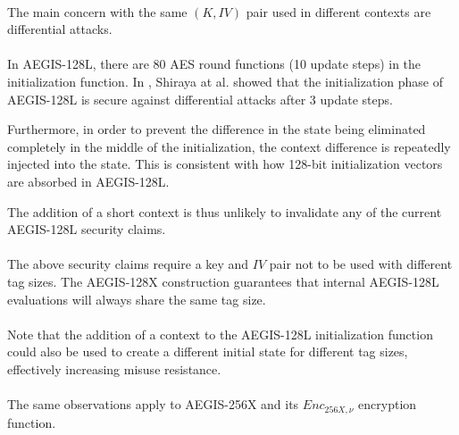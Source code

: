 \documentclass[envcountsame,runningheads,notitlepage]{llncs}
\begin{document}
\paragraph{}

The main concern with the same $(K, IV)$ pair used in different contexts are differential attacks.

\paragraph{}

In AEGIS-128L, there are 80 AES round functions (10 update steps) in the initialization function. In \cite{STSI23}, Shiraya at al. showed that the initialization phase of AEGIS-128L is secure against differential attacks after 3 update steps.

Furthermore, in order to prevent the difference in the state being eliminated completely in the middle of the initialization, the context difference is repeatedly injected into the state. This is consistent with how 128-bit initialization vectors are absorbed in AEGIS-128L.

The addition of a short context is thus unlikely to invalidate any of the current AEGIS-128L security claims.

\paragraph{}

The above security claims require a key and $IV$ pair not to be used with different tag sizes. The AEGIS-128X construction guarantees that internal AEGIS-128L evaluations will always share the same tag size.

\paragraph{}

Note that the addition of a context to the AEGIS-128L initialization function could also be used to create a different initial state for different tag sizes, effectively increasing misuse resistance.

\paragraph{}

The same observations apply to AEGIS-256X and its $Enc_{256X,\nu}$ encryption function.

\paragraph{}
\end{document}

